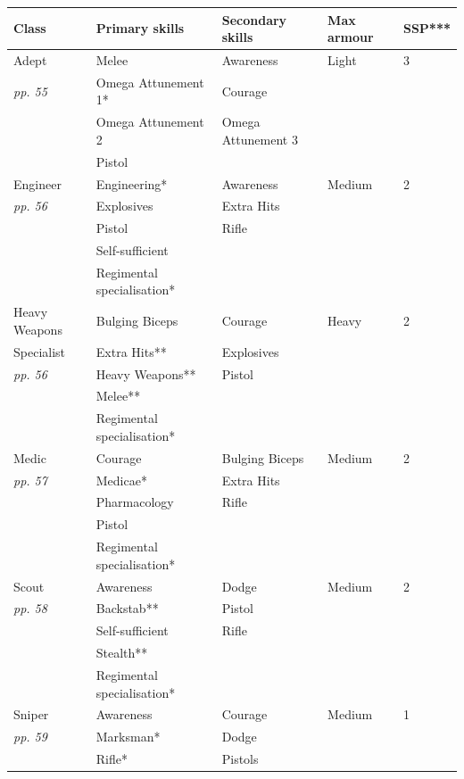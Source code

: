 \begin{table}
\begin{tabular}{|l|l|l|l|l|} \hline 
Class & Primary skills & Secondary skills & Max armour & SSP*** \\
 \hline Adept & Melee & Awareness & Light & 3 \\
 \hline \textit{pp. 55} & Omega Attunement 1* & Courage &  &  \\
 \hline  & Omega Attunement 2 & Omega Attunement 3 &  &  \\
 \hline  & Pistol &  &  &  \\
 \hline Engineer & Engineering* & Awareness & Medium & 2 \\
 \hline \textit{pp. 56} & Explosives & Extra Hits &  &  \\
 \hline  & Pistol & Rifle &  &  \\
 \hline  & Self-sufficient &  &  &  \\
 \hline  & Regimental specialisation* &  &  &  \\
 \hline Heavy Weapons & Bulging Biceps & Courage & Heavy & 2 \\
 \hline Specialist & Extra Hits** & Explosives &  &  \\
 \hline \textit{pp. 56} & Heavy Weapons** & Pistol &  &  \\
 \hline  & Melee** &  &  &  \\
 \hline  & Regimental specialisation* &  &  &  \\
 \hline Medic & Courage & Bulging Biceps & Medium & 2 \\
 \hline \textit{pp. 57} & Medicae* & Extra Hits &  &  \\
 \hline  & Pharmacology & Rifle &  &  \\
 \hline  & Pistol &  &  &  \\
 \hline  & Regimental specialisation* &  &  &  \\
 \hline Scout & Awareness & Dodge & Medium & 2 \\
 \hline \textit{pp. 58} & Backstab** & Pistol &  &  \\
 \hline  & Self-sufficient & Rifle &  &  \\
 \hline  & Stealth** &  &  &  \\
 \hline  & Regimental specialisation* &  &  &  \\
 \hline Sniper & Awareness & Courage & Medium & 1 \\
 \hline \textit{pp. 59} & Marksman* & Dodge &  &  \\
 \hline  & Rifle* & Pistols &  &  \\

\end{tabular}
\end{table}
